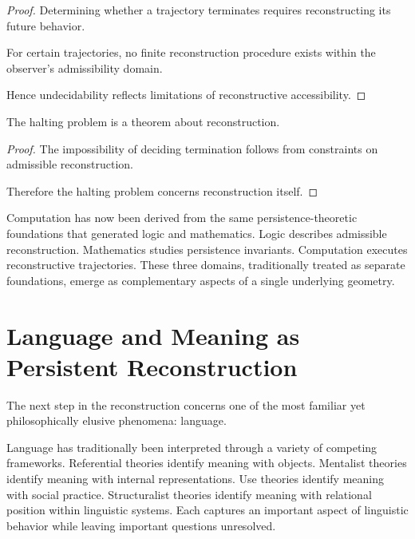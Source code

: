 \documentclass[12pt,oneside]{article}
\theoremstyle{definition}
\begin{document}
\begin{proof}

Determining whether a trajectory terminates requires reconstructing its future behavior.

For certain trajectories, no finite reconstruction procedure exists within the observer's admissibility domain.

Hence undecidability reflects limitations of reconstructive accessibility.

\end{proof}

\begin{corollary}

The halting problem is a theorem about reconstruction.

\end{corollary}

\begin{proof}

The impossibility of deciding termination follows from constraints on admissible reconstruction.

Therefore the halting problem concerns reconstruction itself.

\end{proof}

Computation has now been derived from the same persistence-theoretic foundations that generated logic and mathematics. Logic describes admissible reconstruction. Mathematics studies persistence invariants. Computation executes reconstructive trajectories. These three domains, traditionally treated as separate foundations, emerge as complementary aspects of a single underlying geometry.

\section{Language and Meaning as Persistent Reconstruction}

The next step in the reconstruction concerns one of the most familiar yet philosophically elusive phenomena: language.

Language has traditionally been interpreted through a variety of competing frameworks. Referential theories identify meaning with objects. Mentalist theories identify meaning with internal representations. Use theories identify meaning with social practice. Structuralist theories identify meaning with relational position within linguistic systems. Each captures an important aspect of linguistic behavior while leaving important questions unresolved.
\end{document}
